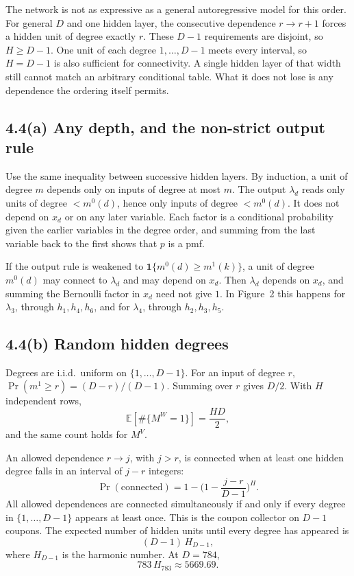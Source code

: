 \documentclass[11pt]{article}
\theoremstyle{remark}
\newcommand{\E}{\mathbb{E}}
\begin{document}
The network is not as expressive as a general autoregressive model for this order. For general \(D\) and one hidden layer, the consecutive dependence \(r\to r+1\) forces a hidden unit of degree exactly \(r\). These \(D-1\) requirements are disjoint, so \(H\ge D-1\). One unit of each degree \(1,\ldots,D-1\) meets every interval, so \(H=D-1\) is also sufficient for connectivity. A single hidden layer of that width still cannot match an arbitrary conditional table. What it does not lose is any dependence the ordering itself permits.

\subsection*{4.4(a) Any depth, and the non-strict output rule}

Use the same inequality between successive hidden layers. By induction, a unit of degree \(m\) depends only on inputs of degree at most \(m\). The output \(\lambda_d\) reads only units of degree \(<m^0(d)\), hence only inputs of degree \(<m^0(d)\). It does not depend on \(x_d\) or on any later variable. Each factor is a conditional probability given the earlier variables in the degree order, and summing from the last variable back to the first shows that \(p\) is a pmf.

If the output rule is weakened to \(\mathbf{1}\{m^0(d)\ge m^1(k)\}\), a unit of degree \(m^0(d)\) may connect to \(\lambda_d\) and may depend on \(x_d\). Then \(\lambda_d\) depends on \(x_d\), and summing the Bernoulli factor in \(x_d\) need not give \(1\). In Figure~2 this happens for \(\lambda_3\), through \(h_1,h_4,h_6\), and for \(\lambda_4\), through \(h_2,h_3,h_5\).

\subsection*{4.4(b) Random hidden degrees}

Degrees are i.i.d.\ uniform on \(\{1,\ldots,D-1\}\). For an input of degree \(r\), \(\Pr(m^1\ge r)=(D-r)/(D-1)\). Summing over \(r\) gives \(D/2\). With \(H\) independent rows,
\[
\E[\#\{M^W=1\}]=\frac{HD}{2},
\]
and the same count holds for \(M^V\).

An allowed dependence \(r\to j\), with \(j>r\), is connected when at least one hidden degree falls in an interval of \(j-r\) integers:
\[
\Pr(\text{connected})=1-\Big(1-\frac{j-r}{D-1}\Big)^H.
\]
All allowed dependences are connected simultaneously if and only if every degree in \(\{1,\ldots,D-1\}\) appears at least once. This is the coupon collector on \(D-1\) coupons. The expected number of hidden units until every degree has appeared is
\[
(D-1)\,H_{D-1},
\]
where \(H_{D-1}\) is the harmonic number. At \(D=784\),
\[
783\,H_{783}\approx 5669.69.
\]
\end{document}
